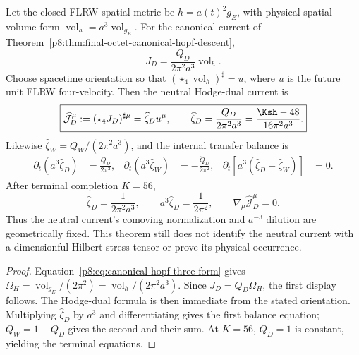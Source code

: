 \documentclass[12pt,a4paper]{article}
\begin{document}
\begin{theorem}
\label{p8:thm:final-octet-flrw-hodge-dilution}
Let the closed-FLRW spatial metric be \(h=a(t)^2g_E\), with physical spatial
volume form \(\operatorname{vol}_h=a^3\operatorname{vol}_{g_E}\).  For the
canonical current of
Theorem~\ref{p8:thm:final-octet-canonical-hopf-descent},
\begin{equation}
 \label{p8:eq:final-octet-current-physical-volume-form}
 \boxed{
 J_D
 =\frac{Q_D}{2\pi^2a^3}\operatorname{vol}_h.}
\end{equation}
Choose spacetime orientation so that
\((\star_4\operatorname{vol}_h)^\sharp=u\), where \(u\) is the future
unit FLRW four-velocity.  Then the neutral Hodge-dual current is
\begin{equation}
 \label{p8:eq:final-octet-neutral-hodge-current}
 \boxed{
 \widehat{\mathcal J}_D^{\mu}
 :=(\star_4J_D)^{\sharp\mu}
 =\widehat\zeta_Du^\mu,
 \qquad
 \widehat\zeta_D
 =\frac{Q_D}{2\pi^2a^3}
 =\frac{\Ksh-48}{16\pi^2a^3}.}
\end{equation}
Likewise \(\widehat\zeta_W=Q_W/(2\pi^2a^3)\), and the internal transfer
balance is
\begin{align}
 \label{p8:eq:final-octet-neutral-current-balance}
 \partial_t(a^3\widehat\zeta_D)&=\frac{\dot Q_D}{2\pi^2},&
 \partial_t(a^3\widehat\zeta_W)&=-\frac{\dot Q_D}{2\pi^2},&
 \partial_t\!\left[a^3(\widehat\zeta_D+\widehat\zeta_W)\right]&=0.
\end{align}
After terminal completion \(K=56\),
\begin{equation}
 \label{p8:eq:terminal-neutral-current-dust-shape}
 \boxed{
 \widehat\zeta_D=\frac{1}{2\pi^2a^3},
 \qquad
 a^3\widehat\zeta_D=\frac{1}{2\pi^2},
 \qquad
 \nabla_\mu\widehat{\mathcal J}_D^\mu=0.}
\end{equation}
Thus the neutral current's comoving normalization and \(a^{-3}\) dilution are
geometrically fixed.  This theorem still does not identify the neutral current
with a dimensionful Hilbert stress tensor or prove its physical occurrence.
\end{theorem}

\begin{proof}
Equation~\eqref{p8:eq:canonical-hopf-three-form} gives
\(\Omega_H=\operatorname{vol}_{g_E}/(2\pi^2)=\operatorname{vol}_h/(2\pi^2a^3)\).  Since \(J_D=Q_D\Omega_H\), the first
display follows.  The Hodge-dual formula is then immediate from the stated
orientation.  Multiplying \(\widehat\zeta_D\) by \(a^3\) and differentiating
gives the first balance equation; \(Q_W=1-Q_D\) gives the second and their
sum.  At \(K=56\), \(Q_D=1\) is constant, yielding the terminal equations.
\end{proof}
\end{document}
